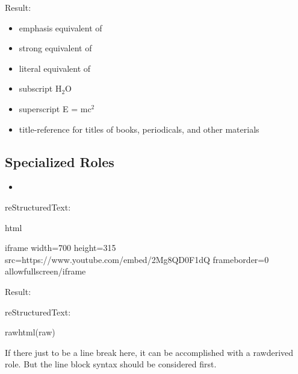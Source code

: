 \documentclass[letterpaper,12pt,english]{sphinxmanual}
\begin{document}
Result:
\begin{itemize}
\item {} 
emphasis \textendash{} equivalent of 

\item {} 
strong \textendash{} equivalent of 

\item {} 
literal \textendash{} equivalent of 

\item {} 
subscript \textendash{} H$_{\text{2}}$O

\item {} 
superscript \textendash{} E = mc$^{\text{2}}$

\item {} 
title-reference \textendash{} for titles of books, periodicals, and other materials

\end{itemize}


\subsection{Specialized Roles}
\label{\detokenize{rtxt:specialized-roles}}\begin{itemize}
\item {} 

\end{itemize}

reStructuredText:

\begin{sphinxVerbatim}[commandchars=\\\{\}]
  html

    \PYGZlt{}iframe width=\PYGZdq{}700\PYGZdq{} height=\PYGZdq{}315\PYGZdq{}
    src=\PYGZdq{}https://www.youtube.com/embed/2Mg8QD0F1dQ\PYGZdq{}
    frameborder=\PYGZdq{}0\PYGZdq{} allowfullscreen\PYGZgt{}\PYGZlt{}/iframe\PYGZgt{}
\end{sphinxVerbatim}

Result:



reStructuredText:

\begin{sphinxVerbatim}[commandchars=\\\{\}]
  raw\PYGZhy{}html(raw)
    

If there just  to be a line break here,
it can be accomplished with a \PYGZdq{}raw\PYGZdq{}\PYGZhy{}derived role.
But the line block syntax should be considered first.
\end{sphinxVerbatim}
\end{document}
